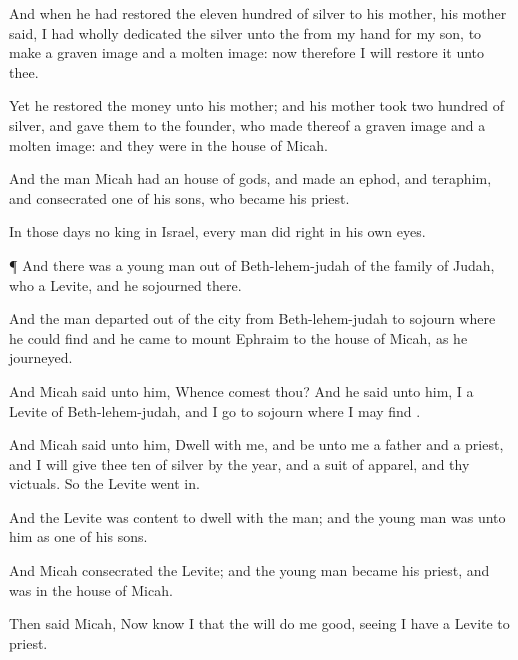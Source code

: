 {And when he had
restored the eleven
hundred
{} of
silver to his
mother, his
mother
said, I had
wholly
dedicated the
silver unto the
{} from my
hand for my
son, to
make a graven
image and a molten
image: now therefore I will
restore it unto thee.

Yet he
restored the
money unto his
mother; and his
mother
took two
hundred
{} of
silver, and
gave them to the
founder, who
made thereof a graven
image and a molten
image: and they were in the
house of
Micah.

And the
man
Micah had an
house of
gods, and
made an
ephod, and
teraphim, and
consecrated
one of his
sons, who became his
priest.

In those
days
{} no
king in
Israel,
{} every
man
did
{}
right in his own
eyes.


\par }{\PP {}¶ And there was a young
man out of
Beth-lehem-judah of the
family of
Judah, who
{} a
Levite, and he
sojourned there.

And the
man
departed out of the
city from
Beth-lehem-judah to
sojourn where he could
find
{} and he
came to
mount
Ephraim to the
house of
Micah, as he
journeyed.

And
Micah
said unto him,
Whence
comest thou? And he
said unto him, I
{} a
Levite of
Beth-lehem-judah, and I
go to
sojourn where I may
find
{}.

And
Micah
said unto him,
Dwell with me, and be unto me a
father and a
priest, and I will
give thee
ten
{} of
silver by the
year, and a
suit of
apparel, and thy
victuals. So the
Levite went
in.

And the
Levite was
content to
dwell with the
man; and the young
man was unto him as
one of his
sons.

And
Micah
consecrated the
Levite; and the young
man became his
priest, and was in the
house of
Micah.

Then
said
Micah, Now
know I that the
{} will do me
good, seeing I have a
Levite to
{}
priest.




\par }
